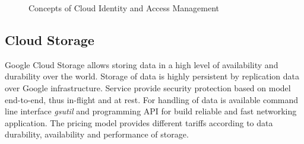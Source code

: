 \documentclass[a4paper,12pt,oneside]{report}
\begin{document}
\begin{figure}[h!]
    \centering
    	
	
    \caption[access]{Concepts of Cloud Identity and Access Management   \centering }
    \label{fig:iam}
\end{figure}


		\subsection{Cloud Storage}
		\label{subsub:datastore}
Google Cloud Storage allows storing data in a high level of availability and durability 
over the world. Storage of data is highly persistent by replication data over Google 
infrastructure. Service provide security protection based 
on model end-to-end, thus in-flight and at rest. For handling of data is available command 
line interface \textit{gsutil} and programming API for build 
reliable and fast networking application. The pricing model provides different tariffs 
according to data durability, availability and performance of storage.
        
\end{document}
